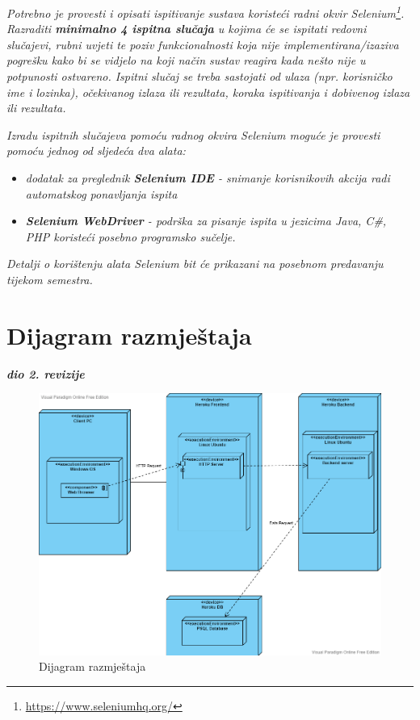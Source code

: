 			 \textit{Potrebno je provesti i opisati ispitivanje sustava koristeći radni okvir Selenium\footnote{\url{https://www.seleniumhq.org/}}. Razraditi \textbf{minimalno 4 ispitna slučaja} u kojima će se ispitati redovni slučajevi, rubni uvjeti te poziv funkcionalnosti koja nije implementirana/izaziva pogrešku kako bi se vidjelo na koji način sustav reagira kada nešto nije u potpunosti ostvareno. Ispitni slučaj se treba sastojati od ulaza (npr. korisničko ime i lozinka), očekivanog izlaza ili rezultata, koraka ispitivanja i dobivenog izlaza ili rezultata.\\ }
			 
			 \textit{Izradu ispitnih slučajeva pomoću radnog okvira Selenium moguće je provesti pomoću jednog od sljedeća dva alata:}
			 \begin{itemize}
			 	\item \textit{dodatak za preglednik \textbf{Selenium IDE} - snimanje korisnikovih akcija radi automatskog ponavljanja ispita	}
			 	\item \textit{\textbf{Selenium WebDriver} - podrška za pisanje ispita u jezicima Java, C\#, PHP koristeći posebno programsko sučelje.}
			 \end{itemize}
		 	\textit{Detalji o korištenju alata Selenium bit će prikazani na posebnom predavanju tijekom semestra.}
			
			\eject 
		
		
		\section{Dijagram razmještaja}
			
			\textbf{\textit{dio 2. revizije}}
			
			 \begin{figure}[H]
			 	\includegraphics[scale=0.5]{slike/razmjestaj.PNG}
			 	\centering
			 	\caption{Dijagram razmještaja}
			 	\label{fig:razmještaj}
			 \end{figure}
			

